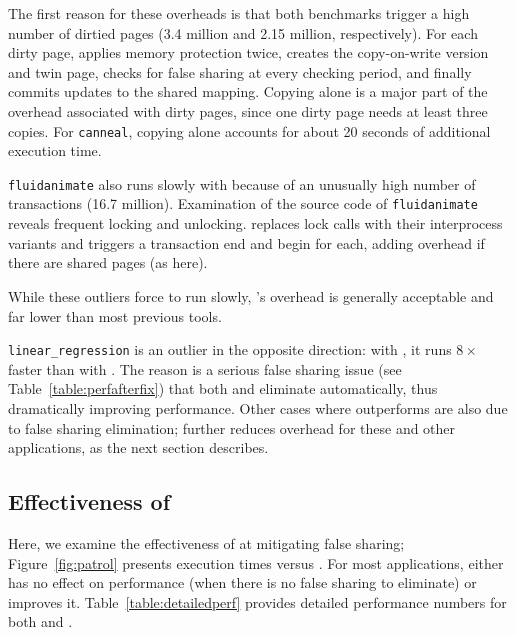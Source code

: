 The first reason for these overheads is that both benchmarks trigger a
high number of dirtied pages (3.4 million and 2.15 million,
respectively). For each dirty page, \sheriffdetect{} applies memory
protection twice, creates the copy-on-write version and twin page,
checks for false sharing at every checking period, and finally commits
updates to the shared mapping. Copying alone is a major part of the
overhead associated with dirty pages, since one dirty page needs at
least three copies.  For \texttt{canneal}, copying alone accounts for
about 20 seconds of additional execution time.

\texttt{fluidanimate} also runs slowly with \sheriffdetect{} because of an unusually
high number of transactions (16.7 million). Examination of the source
code of \texttt{fluidanimate} reveals frequent locking and unlocking.
\sheriff{} replaces lock calls with their interprocess variants and
triggers a transaction end and begin for each, adding overhead if
there are shared pages (as here).

While these outliers force \sheriffdetect{} to run
slowly, \sheriffdetect{}'s overhead is generally acceptable and far
lower than most previous tools.

\texttt{linear\_regression} is an outlier in the opposite direction: with \sheriffdetect{}, it runs
$8\times$ faster than with \pthreads{}. The reason is a serious false
sharing issue (see Table~\ref{table:perfafterfix}) that
both \sheriffdetect{} and
\sheriffprotect{} eliminate automatically, thus dramatically improving
performance. Other cases where \sheriffdetect{}
outperforms \pthreads{} are also due to false sharing
elimination; \sheriffprotect{} further reduces overhead for these and
other applications, as the next section describes.


\subsection{Effectiveness of \sheriffprotect{}}
\label{sec:results-patrol-overhead}

Here, we examine the effectiveness of \sheriffprotect{} at mitigating
false sharing; Figure~\ref{fig:patrol} presents execution times
versus \pthreads{}. For most applications,
\sheriffprotect{} either has no effect on performance (when there is no false sharing to eliminate) or
improves it. Table~\ref{table:detailedperf} provides detailed
performance numbers for both \sheriffprotect{} and \sheriffdetect{}.

